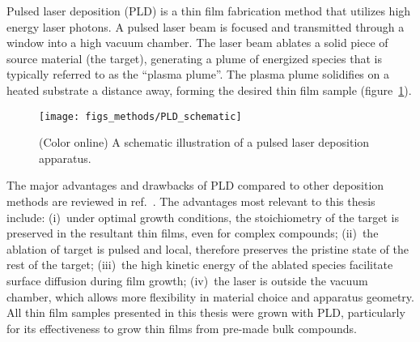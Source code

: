 Pulsed laser deposition (PLD) is a thin film fabrication method that utilizes high energy laser photons. A pulsed laser beam is focused and transmitted through a window into a high vacuum chamber. The laser beam ablates a solid piece of source material (the target), generating a plume of energized species that is typically referred to as the ``plasma plume''. The plasma plume solidifies on a heated substrate a distance away, forming the desired thin film sample (figure~\ref{fig:PLD_schematic}). %
\begin{figure}[ht]%
	\centering%
    \texttt{[image: figs\_methods/PLD\_schematic]}%
    \caption[Schematic of a PLD apparatus]{\label{fig:PLD_schematic}(Color online) A schematic illustration of a pulsed laser deposition apparatus.\footnotemark}%
\end{figure}%
%
%
The major advantages and drawbacks of PLD compared to other deposition methods are reviewed in ref.~\cite{PLD_review}. The advantages most relevant to this thesis include: (i)~under optimal growth conditions, the stoichiometry of the target is preserved in the resultant thin films, even for complex compounds; (ii)~the ablation of target is pulsed and local, therefore preserves the pristine state of the rest of the target; (iii)~the high kinetic energy of the ablated species facilitate surface diffusion during film growth; (iv)~the laser is outside the vacuum chamber, which allows more flexibility in material choice and apparatus geometry. All thin film samples presented in this thesis were grown with PLD, particularly for its effectiveness to grow thin films from pre-made bulk compounds.

